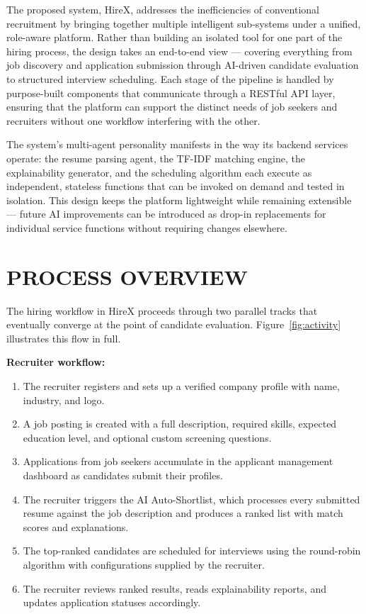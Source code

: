 \documentclass[12pt,a4paper]{report}
\begin{document}
The proposed system, HireX, addresses the inefficiencies of conventional recruitment by bringing together multiple intelligent sub-systems under a unified, role-aware platform. Rather than building an isolated tool for one part of the hiring process, the design takes an end-to-end view — covering everything from job discovery and application submission through AI-driven candidate evaluation to structured interview scheduling. Each stage of the pipeline is handled by purpose-built components that communicate through a RESTful API layer, ensuring that the platform can support the distinct needs of job seekers and recruiters without one workflow interfering with the other.

The system's multi-agent personality manifests in the way its backend services operate: the resume parsing agent, the TF-IDF matching engine, the explainability generator, and the scheduling algorithm each execute as independent, stateless functions that can be invoked on demand and tested in isolation. This design keeps the platform lightweight while remaining extensible — future AI improvements can be introduced as drop-in replacements for individual service functions without requiring changes elsewhere.

\section{PROCESS OVERVIEW}

The hiring workflow in HireX proceeds through two parallel tracks that eventually converge at the point of candidate evaluation. Figure~\ref{fig:activity} illustrates this flow in full.

\textbf{Recruiter workflow:}
\begin{enumerate}[leftmargin=0.5in, label=\arabic*., topsep=4pt, itemsep=2pt]
    \item The recruiter registers and sets up a verified company profile with name, industry, and logo.
    \item A job posting is created with a full description, required skills, expected education level, and optional custom screening questions.
    \item Applications from job seekers accumulate in the applicant management dashboard as candidates submit their profiles.
    \item The recruiter triggers the AI Auto-Shortlist, which processes every submitted resume against the job description and produces a ranked list with match scores and explanations.
    \item The top-ranked candidates are scheduled for interviews using the round-robin algorithm with configurations supplied by the recruiter.
    \item The recruiter reviews ranked results, reads explainability reports, and updates application statuses accordingly.
\end{enumerate}
\end{document}
